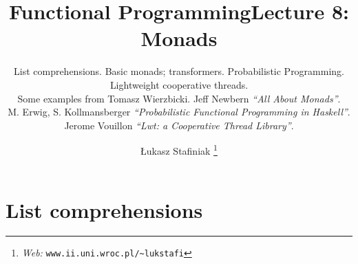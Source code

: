 \documentclass{beamer}
\newcommand{\tmem}[1]{{\em #1\/}}
\newcommand{\tmfnhomepage}[1]{\thanks{\textit{Web:} \texttt{#1}}}
\begin{document}
\title{Functional Programming}

\author{
  {\L}ukasz Stafiniak
  \tmfnhomepage{www.ii.uni.wroc.pl/\~{}lukstafi}
}


\maketitle

\title{Lecture 8: Monads}

\subtitle{List comprehensions. Basic monads; transformers. Probabilistic
Programming.\\
Lightweight cooperative threads.\\
{\small{{\scriptsize{Some examples from Tomasz Wierzbicki.}} Jeff Newbern
{\tmem{``All About Monads''}}.\\
M. Erwig, S. Kollmansberger {\tmem{``Probabilistic Functional Programming in
Haskell''}}.\\
Jerome Vouillon {\tmem{``Lwt: a Cooperative Thread Library''}}.}}}

\maketitle

{}

\section{List comprehensions}
\end{document}
